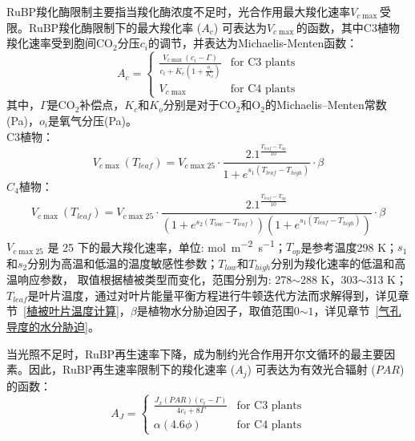 RuBP羧化酶限制主要指当羧化酶浓度不足时，光合作用最大羧化速率$V_{c \max }$受限。RuBP羧化酶限制下的最大羧化率 ($A_c$) 可表达为$V_{c \max }$的函数，其中C3植物羧化速率受到胞间CO$_2$分压$c_i$的调节，并表达为Michaelis-Menten函数：
\begin{equation}\label{A_C1}
A_{c}=\begin{cases}
\frac{V_{c \max }\left(c_{i}-\Gamma\right)}{c_{i}+K_{c}\left(1+\frac{o_{i}}{K_{o}}\right)}
     & \text{for C3 plants} \\ 
V_{c \max } & \text{for C4 plants}
\end{cases}
\end{equation}
其中，$\Gamma$是CO$_2$补偿点，$K_c$和$K_o$分别是对于CO$_2$和O$_2$的Michaelis--Menten常数(Pa)，$o_i$是氧气分压(Pa)。\\
C3植物：\\
\begin{equation}\label{V_cmax_a}
V_{c \max }\left(T_{{leaf }}\right)=V_{c \max 25} \cdot \frac{2.1^{\frac{T_{{leaf }}-T_{o p}}{10}}}{1+e^{s_{1}\left(T_{{leaf }}-T_{{high }}\right)}} \cdot \beta
\end{equation}
$C_4$植物：\\
\begin{equation}\label{V_cmax_b}
V_{c \max }\left(T_{{leaf }}\right)=V_{c \max 25} \cdot \frac{2.1^{\frac{T_{{leaf }}-T_{o p}}{10}}}{\left(1+e^{s_{2}\left(T_{{low }}
 - T_{{leaf }}\right)}\right)\left(1+e^{s_{1}\left(T_{{leaf }}-T_{h i g h}\right)}\right)} \cdot \beta
\end{equation}
$V_{c \max 25}$ 是 25 \textcelsius 下的最大羧化速率，单位: \unit{mol.m^{-2}.s^{-1}}；$T_{op}$是参考温度298 K；$s_1$和$s_2$分别为高温和低温的温度敏感性参数；$T_{low}$和$T_{high}$分别为羧化速率的低温和高温响应参数，
取值根据植被类型而变化，范围分别为: 278$\sim$288 K，303$\sim$313 K；$T_{leaf}$是叶片温度，通过对叶片能量平衡方程进行牛顿迭代方法而求解得到，详见章节~\ref{植被叶片温度计算}，$\beta$是植物水分胁迫因子，取值范围0$\sim1$，详见章节~\ref{气孔导度的水分胁迫}。

当光照不足时，RuBP再生速率下降，成为制约光合作用开尔文循环的最主要因素。因此，RuBP再生速率限制下的羧化速率 ($A_j$) 可表达为有效光合辐射 ($PAR$) 的函数：
\begin{equation}\label{A_J1}
A_{J}=\begin{cases}\frac{J_x\left(PAR\right)\left(c_{i}-\Gamma\right)}{4c_{i}+8\Gamma}
     & \text{for C3 plants} \\
\alpha\left(4.6\phi\right) & \text{for C4 plants}
\end{cases}
\end{equation}

